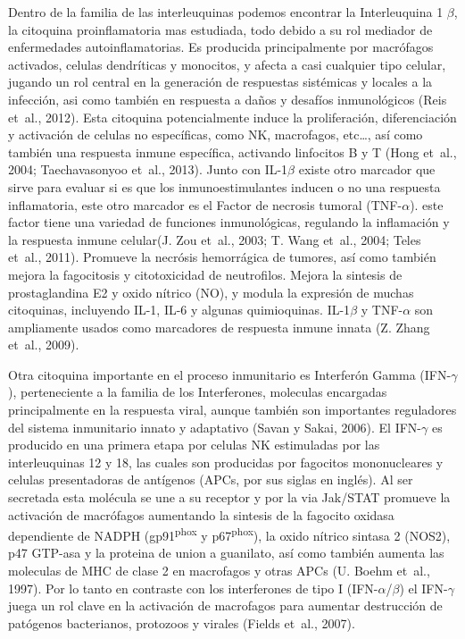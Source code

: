 \documentclass[12pt,letterpaper,oneside]{scrbook}
\begin{document}
Dentro de la familia de las interleuquinas podemos encontrar la
Interleuquina 1 \(\beta\), la citoquina proinflamatoria mas estudiada,
todo debido a su rol mediador de enfermedades autoinflamatorias. Es
producida principalmente por macrófagos activados, celulas dendríticas y
monocitos, y afecta a casi cualquier tipo celular, jugando un rol
central en la generación de respuestas sistémicas y locales a la
infección, asi como también en respuesta a daños y desafíos
inmunológicos (Reis et~al., 2012). Esta citoquina potencialmente induce
la proliferación, diferenciación y activación de celulas no específicas,
como NK, macrofagos, etc\ldots{}, así como también una respuesta inmune
específica, activando linfocitos B y T (Hong et~al., 2004;
Taechavasonyoo et~al., 2013). Junto con IL-1\(\beta\) existe otro
marcador que sirve para evaluar si es que los inmunoestimulantes inducen
o no una respuesta inflamatoria, este otro marcador es el Factor de
necrosis tumoral (TNF-\(\alpha\)). este factor tiene una variedad de
funciones inmunológicas, regulando la inflamación y la respuesta inmune
celular(J. Zou et~al., 2003; T. Wang et~al., 2004; Teles et~al., 2011).
Promueve la necrósis hemorrágica de tumores, así como también mejora la
fagocitosis y citotoxicidad de neutrofilos. Mejora la sintesis de
prostaglandina E2 y oxido nítrico (NO), y modula la expresión de muchas
citoquinas, incluyendo IL-1, IL-6 y algunas quimioquinas. IL-1\(\beta\)
y TNF-\(\alpha\) son ampliamente usados como marcadores de respuesta
inmune innata (Z. Zhang et~al., 2009).

Otra citoquina importante en el proceso inmunitario es Interferón Gamma
(IFN-\(\gamma\)), perteneciente a la familia de los Interferones,
moleculas encargadas principalmente en la respuesta viral, aunque
también son importantes reguladores del sistema inmunitario innato y
adaptativo (Savan y Sakai, 2006). El IFN-\(\gamma\) es producido en una
primera etapa por celulas NK estimuladas por las interleuquinas 12 y 18,
las cuales son producidas por fagocitos mononucleares y celulas
presentadoras de antígenos (APCs, por sus siglas en inglés). Al ser
secretada esta molécula se une a su receptor y por la via Jak/STAT
promueve la activación de macrófagos aumentando la sintesis de la
fagocito oxidasa dependiente de NADPH (\si{gp91^{phox}} y
\si{p67^{phox}}), la oxido nítrico sintasa 2 (NOS2), p47 GTP-asa y la
proteina de union a guanilato, así como también aumenta las moleculas de
MHC de clase 2 en macrofagos y otras APCs (U. Boehm et~al., 1997). Por
lo tanto en contraste con los interferones de tipo I
(IFN-\(\alpha\)/\(\beta\)) el IFN-\(\gamma\) juega un rol clave en la
activación de macrofagos para aumentar destrucción de patógenos
bacterianos, protozoos y virales (Fields et~al., 2007).
\end{document}
